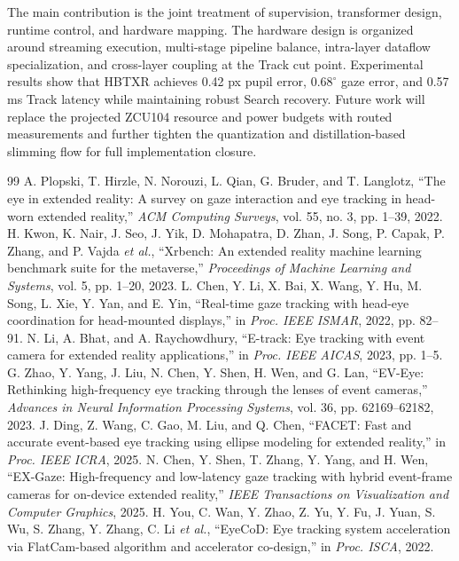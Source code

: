 \documentclass[journal]{IEEEtran}
\newcommand{\etal}{\textit{et al.}}
\begin{document}
The main contribution is the joint treatment of supervision, transformer design, runtime control, and hardware mapping. The hardware design is organized around streaming execution, multi-stage pipeline balance, intra-layer dataflow specialization, and cross-layer coupling at the Track cut point. Experimental results show that HBTXR achieves 0.42 px pupil error, $0.68^{\circ}$ gaze error, and 0.57 ms Track latency while maintaining robust Search recovery. Future work will replace the projected ZCU104 resource and power budgets with routed measurements and further tighten the quantization and distillation-based slimming flow for full implementation closure.

\begin{thebibliography}{99}
\footnotesize
{} A. Plopski, T. Hirzle, N. Norouzi, L. Qian, G. Bruder, and T. Langlotz, ``The eye in extended reality: A survey on gaze interaction and eye tracking in head-worn extended reality,'' \emph{ACM Computing Surveys}, vol. 55, no. 3, pp. 1--39, 2022.
 H. Kwon, K. Nair, J. Seo, J. Yik, D. Mohapatra, D. Zhan, J. Song, P. Capak, P. Zhang, and P. Vajda \etal, ``Xrbench: An extended reality machine learning benchmark suite for the metaverse,'' \emph{Proceedings of Machine Learning and Systems}, vol. 5, pp. 1--20, 2023.
 L. Chen, Y. Li, X. Bai, X. Wang, Y. Hu, M. Song, L. Xie, Y. Yan, and E. Yin, ``Real-time gaze tracking with head-eye coordination for head-mounted displays,'' in \emph{Proc. IEEE ISMAR}, 2022, pp. 82--91.
 N. Li, A. Bhat, and A. Raychowdhury, ``E-track: Eye tracking with event camera for extended reality applications,'' in \emph{Proc. IEEE AICAS}, 2023, pp. 1--5.
 G. Zhao, Y. Yang, J. Liu, N. Chen, Y. Shen, H. Wen, and G. Lan, ``EV-Eye: Rethinking high-frequency eye tracking through the lenses of event cameras,'' \emph{Advances in Neural Information Processing Systems}, vol. 36, pp. 62169--62182, 2023.
 J. Ding, Z. Wang, C. Gao, M. Liu, and Q. Chen, ``FACET: Fast and accurate event-based eye tracking using ellipse modeling for extended reality,'' in \emph{Proc. IEEE ICRA}, 2025.
 N. Chen, Y. Shen, T. Zhang, Y. Yang, and H. Wen, ``EX-Gaze: High-frequency and low-latency gaze tracking with hybrid event-frame cameras for on-device extended reality,'' \emph{IEEE Transactions on Visualization and Computer Graphics}, 2025.
 H. You, C. Wan, Y. Zhao, Z. Yu, Y. Fu, J. Yuan, S. Wu, S. Zhang, Y. Zhang, C. Li \etal, ``EyeCoD: Eye tracking system acceleration via FlatCam-based algorithm and accelerator co-design,'' in \emph{Proc. ISCA}, 2022.

\end{thebibliography}
\end{document}
